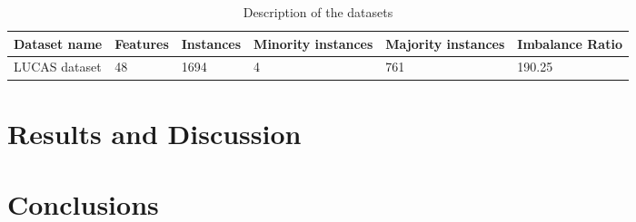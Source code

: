 \documentclass[parskip=full]{scrartcl}
\begin{document}
\begin{table}[H]
	\centering
	\begin{tabular}{|p{2.7cm}|p{3cm}|p{2cm}|p{2cm}|p{2cm}|p{2cm}|}
		\hline
		\textbf{Dataset name} & \textbf{Features} & \textbf{Instances} & 
		\textbf{Minority instances} & \textbf{Majority instances}	& 
		\textbf{Imbalance Ratio} \\
		\hline
		LUCAS dataset & 48 & 1694 & 4 & 761 & 190.25 \\
		\hline
	\end{tabular}
	\caption{\label{tab:datasets}Description of the datasets}
\end{table}

\section{Results and Discussion}

\section{Conclusions}





\end{document}
